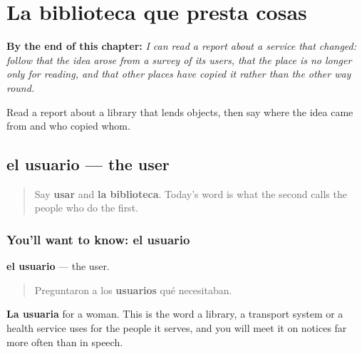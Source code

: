 
\chapter{La biblioteca que presta cosas}
\label{ch:es-encuesta}

\begin{chapteropening}
\textbf{By the end of this chapter:} \emph{I can read a report about a service that changed: follow that the idea arose from a survey of its users, that the place is no longer only for reading, and that other places have copied it rather than the other way round.}

Read a report about a library that lends objects, then say where the idea came from and who copied whom.
\end{chapteropening}

\section[el usuario]{el usuario — the user}

\label{lesson:ES-C472-usuario}



\begin{quote}
Say \textbf{usar} and \textbf{la biblioteca}. Today's word is what the second calls the people who do the first.
\end{quote}

\subsection*{You'll want to know: el usuario}
\textbf{el usuario} — the user.

\begin{quote}
Preguntaron a los \textbf{usuarios} qué necesitaban.
\end{quote}

\textbf{La usuaria} for a woman. This is the word a library, a transport system or a health service uses for the people it serves, and you will meet it on notices far more often than in speech.


